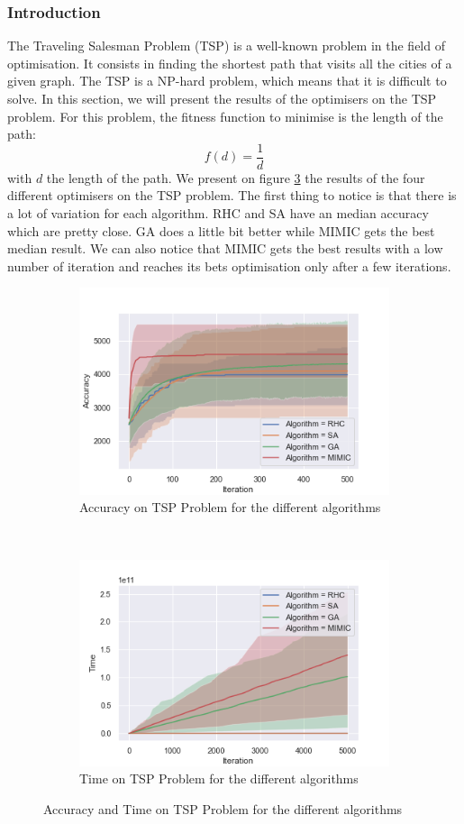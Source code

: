 \documentclass[twocolumn, 10pt]{article}
\begin{document}
			\subsubsection*{Introduction}
				The Traveling Salesman Problem (TSP) is a well-known problem in the field of optimisation. It consists in finding the shortest path that visits all the cities of a given graph. The TSP is a NP-hard problem, which means that it is difficult to solve. In this section, we will present the results of the optimisers on the TSP problem.
				For this problem, the fitness function to minimise is the length of the path:
				\begin{equation}
					f(d) = \frac{1}{d}
				\end{equation}
				with $d$ the length of the path.
				We present on figure \ref{tsp:all} the results of the four different optimisers on the TSP problem. The first thing to notice is that there is a lot of variation for each algorithm. RHC and SA have an median accuracy which are pretty close. GA does a little bit better while MIMIC gets the best median result. We can also notice that MIMIC gets the best results with a low number of iteration and reaches its bets optimisation only after a few iterations.
				\begin{figure}[h]
					\centering
					\begin{subfigure}[t]{\columnwidth}
						\centering
						\includegraphics[width=0.68\linewidth]{../graphics/tsp_all_Iteration_Error_Algorithm.png}
						\caption{Accuracy on TSP Problem for the different algorithms}
						\label{tsp:all_accuracy}
					\end{subfigure}
					~
					\begin{subfigure}[t]{\columnwidth}
						\centering
						\includegraphics[width=0.68\linewidth]{../graphics/tsp_all_Iteration_Time_Algorithm.png}
						\caption{Time on TSP Problem for the different algorithms}
						\label{tsp:all_time}
					\end{subfigure}
					\caption{Accuracy and Time on TSP Problem for the different algorithms}
					\label{tsp:all}
				\end{figure}
\end{document}
